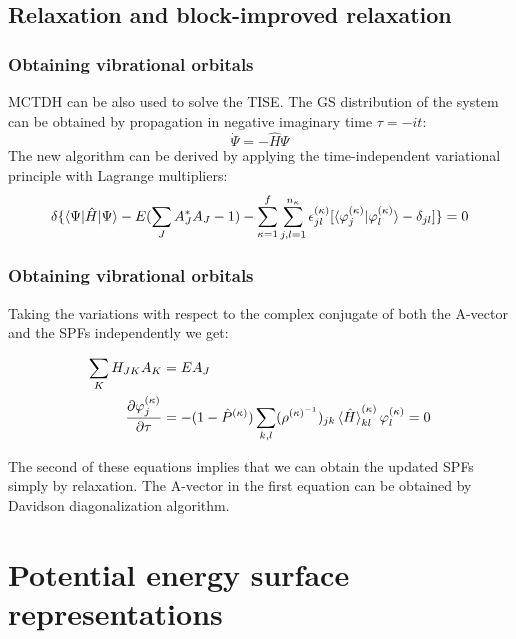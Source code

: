 \documentclass{beamer}
\begin{document}
\subsection{Relaxation and block-improved relaxation}\label{relax}

\begin{frame}
  \frametitle{Obtaining vibrational orbitals}
  MCTDH can be also used to solve the TISE. The GS distribution of the system can be obtained by propagation in negative imaginary time \(\tau=-it\):
\begin{equation}
	\dot{\Psi} = -\hat{H}\Psi
\end{equation}
The new algorithm can be derived by applying the time-independent variational principle with Lagrange multipliers:
\begin{equation}
\delta \{\braket{\Psi|\hat{H}|\Psi} -E(\sum_J A_J^{*}A_J-1) -\sum_{\kappa=1}^f\sum_{j,l=1}^{n_{\kappa}}\epsilon^{(\kappa)}_{jl}[\braket{\varphi_j^{(\kappa)}|\varphi_l^{(\kappa)}} - \delta_{jl}] \} = 0	
\end{equation}
\end{frame}

\begin{frame}
  \frametitle{Obtaining vibrational orbitals}
  Taking the variations with respect to the complex conjugate of both the A-vector and the SPFs independently we get:
  \begin{block}{}
\begin{align}
\begin{split}
	\sum_K H_{JK}A_K &= EA_J \\
	\frac{\partial \varphi^{(\kappa)}_j}{\partial \tau} &= -(1-\hat{P}^{(\kappa)})
	\sum_{k,l}(\rho^{(\kappa)^{-1}})_{jk}\braket{\hat{H}}^{(\kappa)}_{kl}\varphi_l^{(\kappa)} = 0
	\label{mctdh_eom_ti}
\end{split}
\end{align}
\end{block}
The second of these equations implies that we can obtain the updated SPFs simply by relaxation. The A-vector in the first equation can be obtained by Davidson diagonalization algorithm.
  
\end{frame}

\section{Potential energy surface representations}\label{probpes}
\end{document}
